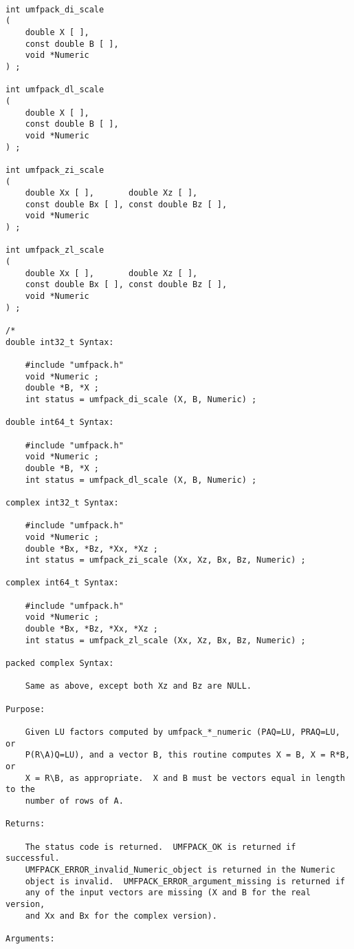 \documentclass[11pt]{article}
\begin{document}
{\footnotesize
\begin{verbatim}

int umfpack_di_scale
(
    double X [ ],
    const double B [ ],
    void *Numeric
) ;

int umfpack_dl_scale
(
    double X [ ],
    const double B [ ],
    void *Numeric
) ;

int umfpack_zi_scale
(
    double Xx [ ],       double Xz [ ],
    const double Bx [ ], const double Bz [ ],
    void *Numeric
) ;

int umfpack_zl_scale
(
    double Xx [ ],       double Xz [ ],
    const double Bx [ ], const double Bz [ ],
    void *Numeric
) ;

/*
double int32_t Syntax:

    #include "umfpack.h"
    void *Numeric ;
    double *B, *X ;
    int status = umfpack_di_scale (X, B, Numeric) ;

double int64_t Syntax:

    #include "umfpack.h"
    void *Numeric ;
    double *B, *X ;
    int status = umfpack_dl_scale (X, B, Numeric) ;

complex int32_t Syntax:

    #include "umfpack.h"
    void *Numeric ;
    double *Bx, *Bz, *Xx, *Xz ;
    int status = umfpack_zi_scale (Xx, Xz, Bx, Bz, Numeric) ;

complex int64_t Syntax:

    #include "umfpack.h"
    void *Numeric ;
    double *Bx, *Bz, *Xx, *Xz ;
    int status = umfpack_zl_scale (Xx, Xz, Bx, Bz, Numeric) ;

packed complex Syntax:

    Same as above, except both Xz and Bz are NULL.

Purpose:

    Given LU factors computed by umfpack_*_numeric (PAQ=LU, PRAQ=LU, or
    P(R\A)Q=LU), and a vector B, this routine computes X = B, X = R*B, or
    X = R\B, as appropriate.  X and B must be vectors equal in length to the
    number of rows of A.

Returns:

    The status code is returned.  UMFPACK_OK is returned if successful.
    UMFPACK_ERROR_invalid_Numeric_object is returned in the Numeric
    object is invalid.  UMFPACK_ERROR_argument_missing is returned if
    any of the input vectors are missing (X and B for the real version,
    and Xx and Bx for the complex version).

Arguments:


\end{verbatim}}
\end{document}
